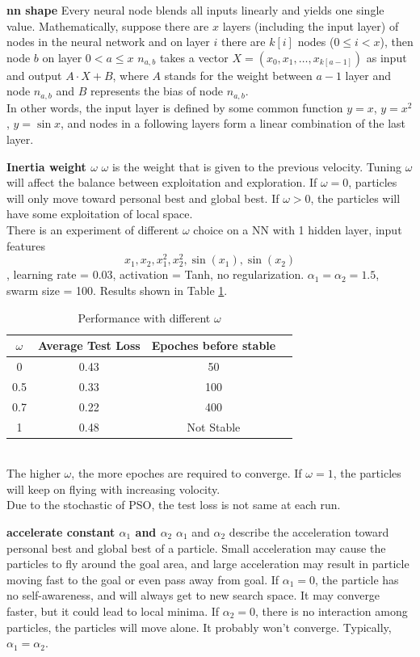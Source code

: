 \documentclass[12pt]{article}
\begin{document}
\noindent \textbf{nn shape} Every neural node blends all inputs linearly and yields one single value. Mathematically, suppose there are $x$ layers (including the input layer) of nodes in the neural network and on layer $i$ there are $k[i]$ nodes ($0\leq i<x$), then node $b$ on layer $0<a\leq x$ $n_{a,b}$ takes a vector 
$X=(x_0,x_1,\ldots,x_{k[a-1]})$ as input and output $A\cdot X+B$, where $A$ stands for the weight between $a-1$ layer and node $n_{a,b}$ and $B$ represents the bias of node $n_{a,b}$.\\
In other words, the input layer is defined by some common function $y=x$, $y=x^2$, $y=\sin x$, and nodes in a following layers form a linear combination of the last layer.
    

\noindent \textbf{Inertia weight $\omega$}  $\omega$ is the weight that is given to the previous velocity. Tuning $\omega$ will affect the balance between exploitation and exploration. If $\omega = 0$, particles will only move toward personal best and global best. If $\omega > 0$, the particles will have some exploitation of local space. \\
There is an experiment of different $\omega$ choice on a NN with 1 hidden layer, input features
\[x_1,x_2,x_1^2,x_2^2,\sin(x_1),\sin(x_2)\], learning rate = 0.03, activation = Tanh, no regularization. $\alpha_1=\alpha_2 = 1.5$, swarm size = 100.
Results shown in Table \ref{t_omega}.
\begin{table}[!ht]
\centering
\begin{tabular}{@{}cccc@{}}
\toprule
$\omega$ & Average Test Loss & Epoches before stable \\ \midrule
0 & 0.43 & 50  \\
0.5 & 0.33  &  100  \\
0.7 & 0.22  &   400 \\
1  & 0.48  & Not Stable  \\
\bottomrule
\end{tabular}
\caption{Performance with different $\omega$}
\label{t_omega}
\end{table}
\\
The higher $\omega$, the more epoches are required to converge. If $\omega = 1$, the particles will keep on flying with increasing volocity.\\
Due to the stochastic of PSO, the test loss is not same at each run. 

\noindent \textbf{accelerate constant $\alpha_1$ and $\alpha_2$}
$\alpha_1$ and $\alpha_2$ describe the acceleration toward personal best and global best of a particle.
Small acceleration may cause the particles to fly around the goal area, and large acceleration may result in particle moving fast to the goal or even pass away from goal. If $\alpha_1 = 0$, the particle has no self-awareness, and will always get to new search space. It may converge faster, but it could lead to local minima. If $\alpha_2=0$, there is no interaction among particles, the particles will move alone. It probably won't converge.
Typically, $\alpha_1 = \alpha_2$.
\end{document}
